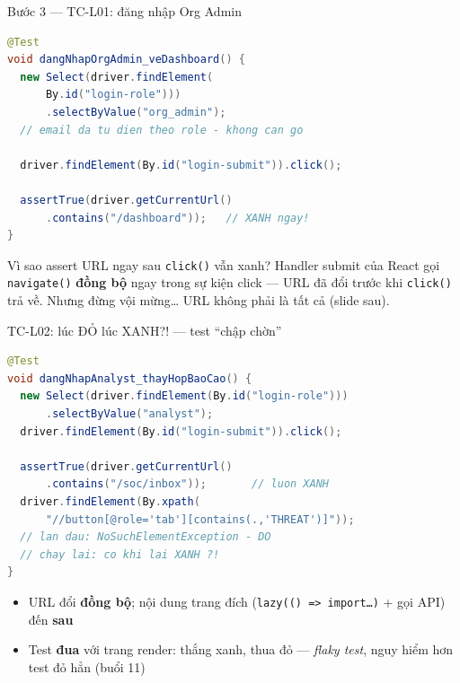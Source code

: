 \documentclass[aspectratio=169,12pt]{beamer}
\begin{document}
\begin{frame}[fragile]{Bước 3 --- TC-L01: đăng nhập Org Admin}
\begin{lstlisting}[language=java,basicstyle=\ttfamily\scriptsize]
@Test
void dangNhapOrgAdmin_veDashboard() {
  new Select(driver.findElement(
      By.id("login-role")))
      .selectByValue("org_admin");
  // email da tu dien theo role - khong can go

  driver.findElement(By.id("login-submit")).click();

  assertTrue(driver.getCurrentUrl()
      .contains("/dashboard"));   // XANH ngay!
}
\end{lstlisting}

  \begin{block}{Vì sao assert URL ngay sau \texttt{click()} vẫn xanh?}
    Handler submit của React gọi \texttt{navigate()} \textbf{đồng bộ} ngay
    trong sự kiện click --- URL đã đổi trước khi \texttt{click()} trả về.
    Nhưng đừng vội mừng\ldots{} URL không phải là tất cả (slide sau).
  \end{block}
\end{frame}

\begin{frame}[fragile]{TC-L02: lúc ĐỎ lúc XANH?! --- test ``chập chờn''}
\begin{lstlisting}[language=java,basicstyle=\ttfamily\scriptsize]
@Test
void dangNhapAnalyst_thayHopBaoCao() {
  new Select(driver.findElement(By.id("login-role")))
      .selectByValue("analyst");
  driver.findElement(By.id("login-submit")).click();

  assertTrue(driver.getCurrentUrl()
      .contains("/soc/inbox"));       // luon XANH
  driver.findElement(By.xpath(
      "//button[@role='tab'][contains(.,'THREAT')]"));
  // lan dau: NoSuchElementException - DO
  // chay lai: co khi lai XANH ?!
}
\end{lstlisting}

  \begin{itemize}
    \item URL đổi \textbf{đồng bộ}; nội dung trang đích
          (\texttt{lazy(() => import\ldots)} + gọi API) đến \textbf{sau}
    \item Test \textbf{đua} với trang render: thắng xanh, thua đỏ ---
          \emph{flaky test}, nguy hiểm hơn test đỏ hẳn (buổi 11)
  \end{itemize}
\end{frame}
\end{document}
